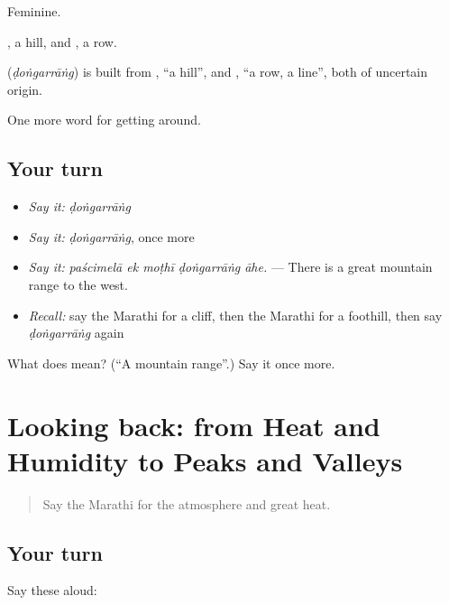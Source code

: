 Feminine.

, a hill, and , a row.

\begin{cousinweb}
\textbf{} (\emph{ḍoṅgarrāṅg}) is built from \textbf{}, \textquotedblleft{}a hill\textquotedblright{}, and \textbf{}, \textquotedblleft{}a row, a line\textquotedblright{}, both of uncertain origin.
\end{cousinweb}

\begin{grammarlens}[title={What you've built}]
One more word for getting around.
\end{grammarlens}

\subsection*{Your turn}
\begin{itemize}
\raggedright
  \item \emph{Say it:} \emph{ḍoṅgarrāṅg}
  \item \emph{Say it:} \emph{ḍoṅgarrāṅg}, once more
  \item \emph{Say it:} \emph{paścimelā ek moṭhī ḍoṅgarrāṅg āhe.} — There is a great mountain range to the west.
  \item \emph{Recall:} say the Marathi for a cliff, then the Marathi for a foothill, then say \emph{ḍoṅgarrāṅg} again
\end{itemize}

\begin{tcolorbox}[breakable,colback=teal!4,colframe=teal!35!black,title={Before you move on}]
What does  mean? (\textquotedblleft{}A mountain range\textquotedblright{}.) Say it once more.
\end{tcolorbox}
\section[(dialogue)]{Looking back: from Heat and Humidity to Peaks and Valleys}

\label{lesson:MR-R442-review-436-442}



\begin{quote}
Say the Marathi for the atmosphere and great heat.
\end{quote}

\subsection*{Your turn}
Say these aloud:

